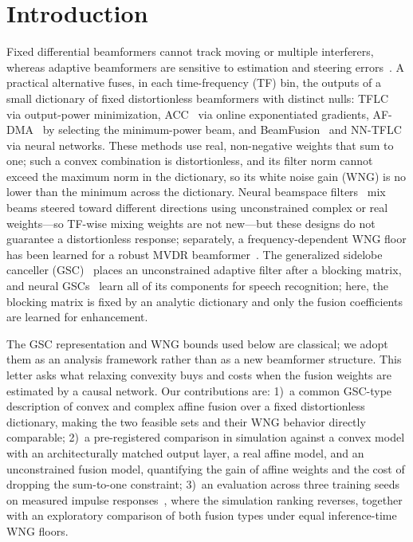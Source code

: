 \documentclass[journal]{IEEEtran}
\begin{document}
\section{Introduction}
Fixed differential beamformers cannot track moving or multiple interferers, whereas adaptive beamformers are sensitive to estimation and steering errors~\cite{cox1987robust}. A practical alternative fuses, in each time-frequency (TF) bin, the outputs of a small dictionary of fixed distortionless beamformers with distinct nulls: TFLC~\cite{yamaoka2021tflc} via output-power minimization, ACC~\cite{jin2024acc} via online exponentiated gradients, AF-DMA~\cite{zhao2025afdma} by selecting the minimum-power beam, and BeamFusion~\cite{qian2026beamfusion} and NN-TFLC~\cite{chen2026nntflc} via neural networks. These methods use real, non-negative weights that sum to one; such a convex combination is distortionless, and its filter norm cannot exceed the maximum norm in the dictionary, so its white noise gain (WNG) is no lower than the minimum across the dictionary. Neural beamspace filters~\cite{liu2022beamspace,li2023taylorbeamixer} mix beams steered toward different directions using unconstrained complex or real weights---so TF-wise mixing weights are not new---but these designs do not guarantee a distortionless response; separately, a frequency-dependent WNG floor has been learned for a robust MVDR beamformer~\cite{deng2026wng}. The generalized sidelobe canceller (GSC)~\cite{griffiths1982gsc} places an unconstrained adaptive filter after a blocking matrix, and neural GSCs~\cite{li2020dnngsc,li2021dnngsc} learn all of its components for speech recognition; here, the blocking matrix is fixed by an analytic dictionary and only the fusion coefficients are learned for enhancement.

The GSC representation and WNG bounds used below are classical; we adopt them as an analysis framework rather than as a new beamformer structure. This letter asks what relaxing convexity buys and costs when the fusion weights are estimated by a causal network. Our contributions are:
1)~a common GSC-type description of convex and complex affine fusion over a fixed distortionless dictionary, making the two feasible sets and their WNG behavior directly comparable;
2)~a pre-registered comparison in simulation against a convex model with an architecturally matched output layer, a real affine model, and an unconstrained fusion model, quantifying the gain of affine weights and the cost of dropping the sum-to-one constraint;
3)~an evaluation across three training seeds on measured impulse responses~\cite{hadad2014mird}, where the simulation ranking reverses, together with an exploratory comparison of both fusion types under equal inference-time WNG floors.
\end{document}

